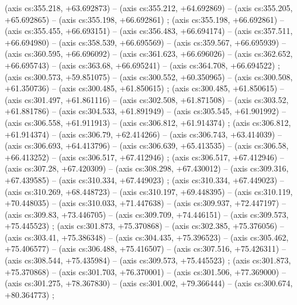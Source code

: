     (axis cs:355.218,    +63.692873) --  (axis cs:355.212,    +64.692869) --  (axis cs:355.205,    +65.692865) --  (axis cs:355.198,    +66.692861) ;
    (axis cs:355.198,    +66.692861) --  (axis cs:355.455,    +66.693151) --  (axis cs:356.483,    +66.694174) --  (axis cs:357.511,    +66.694980) --  (axis cs:358.539,    +66.695569) --  (axis cs:359.567,    +66.695939) --  (axis cs:360.595,    +66.696092) --  (axis cs:361.623,    +66.696026) --  (axis cs:362.652,    +66.695743) --  (axis cs:363.68,    +66.695241) --  (axis cs:364.708,    +66.694522) ;
    (axis cs:300.573,    +59.851075) --  (axis cs:300.552,    +60.350965) --  (axis cs:300.508,    +61.350736) --  (axis cs:300.485,    +61.850615) ;
    (axis cs:300.485,    +61.850615) --  (axis cs:301.497,    +61.861116) --  (axis cs:302.508,    +61.871508) --  (axis cs:303.52,    +61.881786) --  (axis cs:304.533,    +61.891949) --  (axis cs:305.545,    +61.901992) --  (axis cs:306.558,    +61.911913) --  (axis cs:306.812,    +61.914374) ;
    (axis cs:306.812,    +61.914374) --  (axis cs:306.79,    +62.414266) --  (axis cs:306.743,    +63.414039) --  (axis cs:306.693,    +64.413796) --  (axis cs:306.639,    +65.413535) --  (axis cs:306.58,    +66.413252) --  (axis cs:306.517,    +67.412946) ;
    (axis cs:306.517,    +67.412946) --  (axis cs:307.28,    +67.420309) --  (axis cs:308.298,    +67.430012) --  (axis cs:309.316,    +67.439585) --  (axis cs:310.334,    +67.449023) ;
    (axis cs:310.334,    +67.449023) --  (axis cs:310.269,    +68.448723) --  (axis cs:310.197,    +69.448395) --  (axis cs:310.119,    +70.448035) --  (axis cs:310.033,    +71.447638) --  (axis cs:309.937,    +72.447197) --  (axis cs:309.83,    +73.446705) --  (axis cs:309.709,    +74.446151) --  (axis cs:309.573,    +75.445523) ;
    (axis cs:301.873,    +75.370868) --  (axis cs:302.385,    +75.376056) --  (axis cs:303.41,    +75.386348) --  (axis cs:304.435,    +75.396523) --  (axis cs:305.462,    +75.406577) --  (axis cs:306.488,    +75.416507) --  (axis cs:307.516,    +75.426311) --  (axis cs:308.544,    +75.435984) --  (axis cs:309.573,    +75.445523) ;
    (axis cs:301.873,    +75.370868) --  (axis cs:301.703,    +76.370001) --  (axis cs:301.506,    +77.369000) --  (axis cs:301.275,    +78.367830) --  (axis cs:301.002,    +79.366444) --  (axis cs:300.674,    +80.364773) ;
